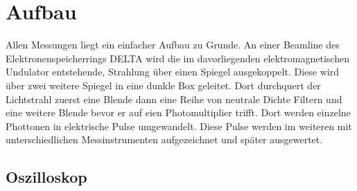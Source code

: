 \section{Aufbau}
\label{sec:Aufbau}
Allen Messungen liegt ein einfacher Aufbau zu Grunde. An einer Beamline des Elektronenspeicherrings DELTA
wird die im davorliegenden elektromagnetischen Undulator entstehende, Strahlung über einen Spiegel 
ausgekoppelt. Diese wird über zwei weitere Spiegel in eine dunkle Box geleitet. Dort durchquert der 
Lichtstrahl zuerst eine Blende dann eine Reihe von neutrale Dichte Filtern und eine weitere Blende bevor 
er auf eien Photomultiplier trifft. Dort werden einzelne Phottonen in elektrische Pulse umgewandelt.
Diese Pulse werden im weiteren mit unterschiedlichen Messinstrumenten aufgezeichnet und später ausgewertet.
\subsection{Oszilloskop}
\label{sec:Oszilloskop}

